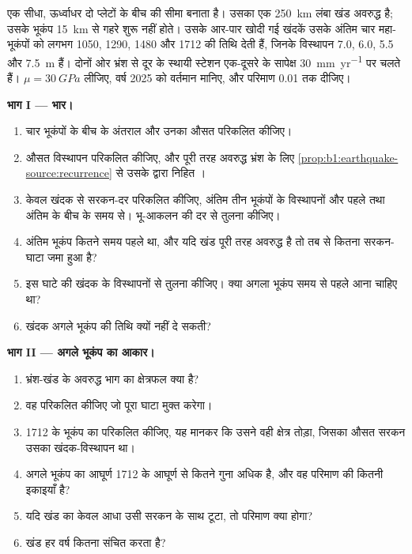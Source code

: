 \begin{problem}
\label{pb:b1:earthquake-source:1}
एक सीधा, ऊर्ध्वाधर  दो प्लेटों के बीच की सीमा बनाता है। उसका एक \qty{250}{km} लंबा खंड अवरुद्ध है; उसके भूकंप \qty{15}{km} से गहरे शुरू नहीं होते। उसके आर-पार खोदी गई खंदकें उसके अंतिम चार महा-भूकंपों को लगभग 1050, 1290, 1480 और 1712 की तिथि देती हैं, जिनके विस्थापन \num{7.0}, \num{6.0}, \num{5.5} और \qty{7.5}{m} हैं। दोनों ओर भ्रंश से दूर के स्थायी स्टेशन एक-दूसरे के सापेक्ष \qty{30}{mm.yr^{-1}} पर चलते हैं। $\mu =
\qty{30}{GPa}$ लीजिए, वर्ष 2025 को वर्तमान मानिए, और परिमाण 0.01 तक दीजिए।

\medskip
\noindent\textbf{भाग I --- भार।}
\begin{enumerate}
  \item चार भूकंपों के बीच के अंतराल और उनका औसत परिकलित कीजिए।
  \item औसत विस्थापन परिकलित कीजिए, और पूरी तरह अवरुद्ध भ्रंश के लिए \cref{prop:b1:earthquake-source:recurrence} से उसके द्वारा निहित ।
  \item केवल खंदक से सरकन-दर परिकलित कीजिए, अंतिम तीन भूकंपों के विस्थापनों और पहले तथा अंतिम के बीच के समय से। भू-आकलन की दर से तुलना कीजिए।
  \item अंतिम भूकंप कितने समय पहले था, और यदि खंड पूरी तरह अवरुद्ध है तो तब से कितना सरकन-घाटा जमा हुआ है?
  \item इस घाटे की खंदक के विस्थापनों से तुलना कीजिए। क्या अगला भूकंप समय से पहले आना चाहिए था?
  \item खंदक अगले भूकंप की तिथि क्यों नहीं दे सकती?
\end{enumerate}

\medskip
\noindent\textbf{भाग II --- अगले भूकंप का आकार।}
\begin{enumerate}[resume]
  \item भ्रंश-खंड के अवरुद्ध भाग का क्षेत्रफल क्या है?
  \item वह  परिकलित कीजिए जो पूरा घाटा मुक्त करेगा।
  \item 1712 के भूकंप का  परिकलित कीजिए, यह मानकर कि उसने वही क्षेत्र तोड़ा, जिसका औसत सरकन उसका खंदक-विस्थापन था।
  \item अगले भूकंप का आघूर्ण 1712 के आघूर्ण से कितने गुना अधिक है, और वह परिमाण की कितनी इकाइयाँ है?
  \item यदि खंड का केवल आधा उसी सरकन के साथ टूटा, तो परिमाण क्या होगा?
  \item खंड हर वर्ष कितना  संचित करता है?
\end{enumerate}


\end{problem}

